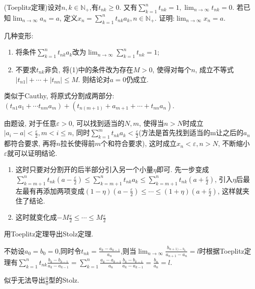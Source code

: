      \begin{exercise}
         (Toeplitz定理)设对$n,k\in \mathbb{N}_+$,有$t_{nk}\geqslant 0$. 又有$\sum_{k=1}^{n}t_{nk}=1, \lim_{n\to\infty}t_{nk}=0$. 若已知$\lim_{n\to\infty}a_n=a$, 定义$x_n=\sum_{k=1}^{n}t_{nk}a_k, n\in \mathbb{N}_+$. 证明:$\lim_{n\to\infty}x_n=a$.

         几种变形:
         \begin{enumerate}
             \item 将条件$\sum_{k=1}^{n}t_{nk}a_k$改为$\lim_{n\to\infty}\sum_{k=1}^{n}t_{nk}=1$;
             \item 不要求$t_{nk}$非负, 将(1)中的条件改为存在$M>0$, 使得对每个$n$, 成立不等式$|t_{n1}|+\cdots+|t_{nn}|\leqslant M$. 则结论对$a=0$仍成立.
         \end{enumerate}
     \end{exercise}
     \begin{solution}
         类似于Cauthy, 将原式分割成两部分:$(t_{n1}a_1+\cdots t_{nm}a_m)+(t_{n(m+1)}+a_{m+1}+\cdots+t_{nn}a_n)$.

         由题设, 对于任意$\varepsilon>0$, 可以找到适当的$N,m$, 使得当$n>N$时成立$|a_i-a|<\frac{\varepsilon}{2}, m<i \leqslant n$, 同时$\sum_{k=1}^{m}t_{nk}a_k<\frac{\varepsilon}{2}$(方法是首先找到适当的m让之后的$a_n$都符合要求, 再将$n$拉长使得前$m$个和符合要求), 这时成立$x_n<\varepsilon, n>N$, 不断缩小$\varepsilon$就可以证明结论.
     \end{solution}
     \begin{note}
         \begin{enumerate}
             \item 这时只要对分割开的后半部分引入另一个小量$\eta $即可. 先一步变成$\sum_{k=m+1}^{n}t_{nk}(a-\frac{\varepsilon}{2})\leqslant \sum_{k=m+1}^{n}t_{nk}a_k \leqslant \sum_{k=m+1}^{n}t_{nk}(a+\frac{\varepsilon}{2})$, 引入$\eta$后最左最有再添加两项变成$(1-\eta)(a-\frac{\varepsilon}{2})\leqslant \cdots \leqslant (1+\eta)(a+\frac{\varepsilon}{2})$, 这样就夹住了结论.
             \item 这时就变化成$-M\frac{\varepsilon}{2}\leqslant \cdots \leqslant M\frac{\varepsilon}{2}$
         \end{enumerate}
     \end{note}

     \begin{exercise}
         用Toeplitz定理导出Stolz定理.
     \end{exercise}
     \begin{solution}
         不妨设$a_0=b_0=0$,同时令$t_{nk}=\frac{a_k-a_{k-1}}{a_n}$,则当$\lim_{n\to\infty}\frac{b_{n+1)-b_n}}{a_{n+1}-a_n}=l$时根据Toeplitz定理有$\sum_{k=1}^{n}t_{nk}\frac{b_k-b_{k-1}}{a_k-a_{k-1}}=\sum_{k=1}^{n}\frac{a_k-a_{k-1}}{a_n}\frac{b_k-b_{k-1}}{a_k-a_{k-1}}=\frac{b_{n}}{a_{n}}=l$.
     \end{solution}
     \begin{note}
         似乎无法导出$\frac{0}{0}$型的Stolz.
     \end{note}
